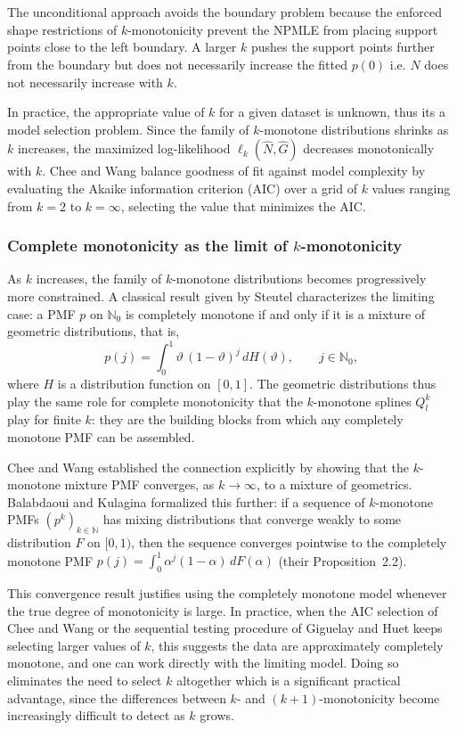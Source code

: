 \documentclass{article}
\begin{document}
{The unconditional approach avoids the boundary problem because the enforced shape restrictions of $k$-monotonicity prevent the NPMLE from placing support points close to the left boundary. A larger $k$ pushes the support points further from the boundary but does not necessarily increase the fitted $p(0)$ i.e. $\hat{N}$ does not necessarily increase with $k$.

In practice, the appropriate value of $k$ for a given dataset is unknown, thus its a model selection problem. Since the family of $k$-monotone distributions shrinks as $k$ increases, the maximized log-likelihood $\ell_k(\hat{N}, \hat{G})$ decreases monotonically with $k$. Chee and Wang balance goodness of fit against model complexity by evaluating the Akaike information criterion (AIC) over a grid of $k$ values ranging from $k = 2$ to $k = \infty$, selecting the value that minimizes the AIC.

\subsubsection{Complete monotonicity as the limit of $k$-monotonicity}

As $k$ increases, the family of $k$-monotone distributions becomes progressively more constrained. A classical result given by Steutel \cite{Steutel1969} characterizes the limiting case: a PMF $p$ on $\mathbb{N}_0$ is completely monotone if and only if it is a mixture of geometric distributions, that is,
\[
p(j) = \int_0^1 \vartheta\,(1-\vartheta)^j \, dH(\vartheta), 
\qquad j \in \mathbb{N}_0,
\]
where $H$ is a distribution function on $[0,1]$. The geometric distributions thus play the same role for complete monotonicity that the $k$-monotone splines $Q^k_l$ play for finite $k$: they are the building blocks from which any completely monotone PMF can be assembled.

Chee and Wang \cite{CheeWang2016} established the connection explicitly by showing that the $k$-monotone mixture PMF converges, as $k \to \infty$, to a mixture of geometrics. Balabdaoui and Kulagina \cite{BalabdaouiKulagina2020} formalized this further: if a sequence of $k$-monotone PMFs $(p^k)_{k \in \mathbb{N}}$ has mixing distributions that converge weakly to some distribution $F$ on $[0,1)$, then the sequence converges pointwise to the completely monotone PMF $p(j) = \int_0^1 \alpha^j (1-\alpha)\, dF(\alpha)$ (their Proposition~2.2).

This convergence result justifies using the completely monotone model whenever the true degree of monotonicity is large. In practice, when the AIC selection of Chee and Wang or the sequential testing procedure of Giguelay and Huet \cite{GiguelayHuet2018} keeps selecting larger values of $k$, this suggests the data are approximately completely monotone, and one can work directly with the limiting model. Doing so eliminates the need to select $k$ altogether which is a significant practical advantage, since the differences between $k$- and $(k+1)$-monotonicity become increasingly difficult to detect as $k$ grows.

}
\end{document}
